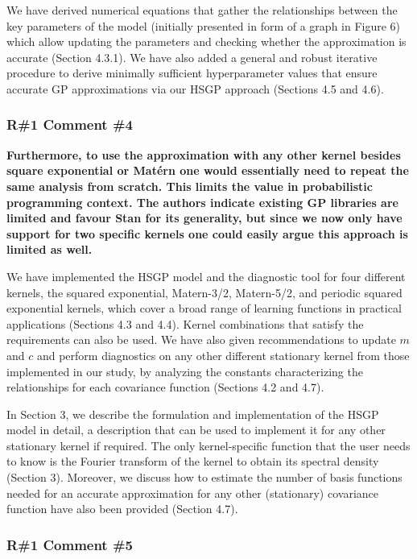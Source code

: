\documentclass[11pt]{report}
\begin{document}
We have derived numerical equations that gather the relationships between the key parameters of the model (initially presented in form of a graph in Figure 6) which allow updating the parameters and checking whether the approximation is accurate (Section 4.3.1). We have also added a general and robust iterative procedure to derive minimally sufficient hyperparameter values that ensure accurate GP approximations via our HSGP approach (Sections 4.5 and 4.6).

\subsubsection*{R\#1 Comment \#4}

\textbf{Furthermore, to use the approximation with any other kernel besides square exponential or Matérn one would essentially need to repeat the same analysis from scratch. This limits the value in probabilistic programming context. The authors indicate existing GP  libraries are limited and favour Stan for its generality, but since we now only have support for two specific kernels one could easily argue this approach is limited as well.}

We have implemented the HSGP model and the diagnostic tool for four different kernels, the squared exponential, Matern-3/2, Matern-5/2, and periodic squared exponential kernels, which cover a broad range of learning functions in practical applications (Sections 4.3 and 4.4). Kernel combinations that satisfy the requirements can also be used. We have also given recommendations to update $m$ and $c$ and perform diagnostics on any other different stationary kernel from those implemented in our study, by analyzing the constants characterizing the relationships for each covariance function (Sections 4.2 and 4.7). 

In Section 3, we describe the formulation and implementation of the HSGP model in detail, a description that can be used to implement it for any other stationary kernel if required. The only kernel-specific function that the user needs to know is the Fourier transform of the kernel to obtain its spectral density (Section 3). Moreover, we discuss how to estimate the number of basis functions needed for an accurate approximation for any other (stationary) covariance function have also been provided (Section 4.7).


\subsubsection*{R\#1 Comment \#5}
\end{document}

